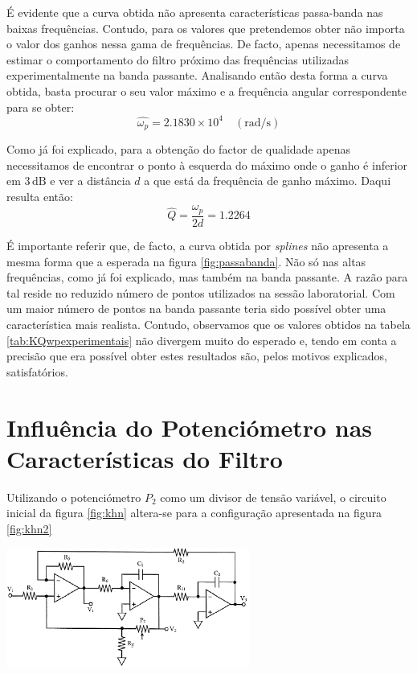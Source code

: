 \documentclass[a4paper,11pt]{report}
\begin{document}
É evidente que a curva obtida não apresenta características passa-banda nas baixas frequências. Contudo, para os valores que pretendemos obter não importa o valor dos ganhos nessa gama de frequências. De facto, apenas necessitamos de estimar o comportamento do filtro próximo das frequências utilizadas experimentalmente na banda passante. Analisando então desta forma a curva obtida, basta procurar o seu valor máximo e a frequência angular correspondente para se obter:
\[
\widehat{\omega_p}=2.1830\times 10^4\quad (\textrm{rad/s})
\]

Como já foi explicado, para a obtenção do factor de qualidade apenas necessitamos de encontrar o ponto à esquerda do máximo onde o ganho é inferior em $3\,\textrm{dB}$ e ver a distância $d$ a que está da frequência de ganho máximo. Daqui resulta então:
\[
\widehat{Q}=\frac{\omega_p}{2d}=1.2264
\]

É importante referir que, de facto, a curva obtida por \textit{splines} não apresenta a mesma forma que a esperada na figura \ref{fig:passabanda}. Não só nas altas frequências, como já foi explicado, mas também na banda passante. A razão para tal reside no reduzido número de pontos utilizados na sessão laboratorial. Com um maior número de pontos na banda passante teria sido possível obter uma característica mais realista. Contudo, observamos que os valores obtidos na tabela \ref{tab:KQwpexperimentais} não divergem muito do esperado e, tendo em conta a precisão que era possível obter estes resultados são, pelos motivos explicados, satisfatórios.

\section{Influência do Potenciómetro nas Características do Filtro}

Utilizando o potenciómetro $P_2$ como um divisor de tensão variável, o circuito inicial da figura \ref{fig:khn} altera-se para a configuração apresentada na figura \ref{fig:khn2}

\begin{center}
     \includegraphics[angle=0,width=0.6\textwidth]{khn2.png}
     \label{fig:khn2}
     \end{center}
\end{document}
